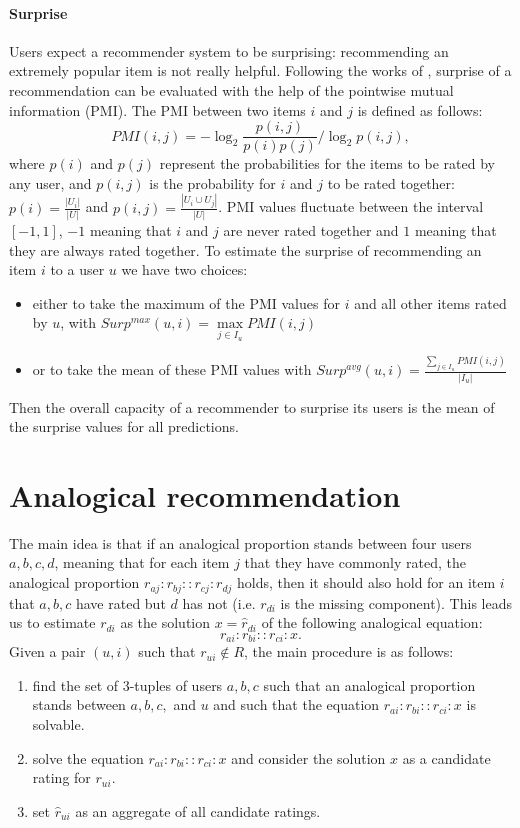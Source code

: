 \paragraph{Surprise\\}
Users expect a recommender system to be surprising: recommending an extremely
popular item is not really helpful. Following the works of
\cite{KamBriRecSys2014}, surprise of a recommendation can be evaluated with the
help of the pointwise mutual
information (PMI). The PMI between two items $i$ and $j$ is defined as follows:
$$PMI(i, j) = -\log_2 \frac{p(i, j)}{p(i)p(j)} / \log_2 p(i, j),$$
where $p(i)$ and $p(j)$  represent the probabilities for the items to be rated
by any user, and $p(i, j)$ is the probability for $i$ and $j$ to be rated
together: $p(i) = \tfrac{|U_i|}{|U|}$ and $p(i, j) = \tfrac{|U_i \cup
U_j|}{|U|}$. PMI values fluctuate between the interval $[-1, 1]$, $-1$ meaning
that $i$ and $j$ are never rated together and $1$ meaning that they are always
rated together. To estimate the surprise of recommending an item $i$ to a user
$u$ we have two choices:
\begin{itemize}
\item either to take the maximum of the PMI values for $i$ and all
other items rated by $u$, with $Surp^{max}(u, i) = \max\limits_{j\in I_u} PMI(i, j)$
\item
 or to take the mean of these PMI values with $Surp^{avg}(u, i) =
\frac{\sum_{j \in I_u} PMI(i, j)}{|I_u|}$
\end{itemize}
Then the overall capacity of a recommender to surprise its users is the mean of the
surprise values for all predictions.

\section{Analogical recommendation}
\label{sec:analogical_recommendation}

The main idea is that if an analogical proportion stands between four
users $a, b, c, d$, meaning that for each item $j$ that they have commonly
rated, the analogical proportion $r_{aj} : r_{bj} :: r_{cj} : r_{dj}$ holds,
then it should also hold for an item $i$ that $a, b, c$ have rated but $d$ has
not (i.e. $r_{di}$ is the missing component). This leads us to estimate
$r_{di}$ as the solution $x = \hat{r}_{di}$ of the following analogical equation:
$$r_{ai} : r_{bi} :: r_{ci} : x.$$
\noindent
Given a pair $(u,i)$ such that $r_{ui} \notin R$, the main procedure is as
follows:
\begin{enumerate}
\item find the set of 3-tuples of users $a, b, c$ such that an analogical proportion
stands between $a, b, c,$ and $u$ and such that the equation $r_{ai} : r_{bi} :: r_{ci} : x$
is solvable.
\item solve the equation $r_{ai} : r_{bi} :: r_{ci} : x$ and consider the solution
$x$ as a candidate rating for $r_{ui}$.
\item set $\hat{r}_{ui}$ as an aggregate of all candidate ratings.
\end{enumerate}

